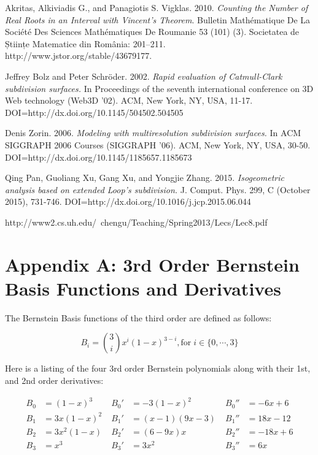 \documentclass[12pt, letterpaper]{article}
\begin{document}
\begin{thebibliography}{9}
Akritas, Alkiviadis G., and Panagiotis S. Vigklas. 2010.
\emph{Counting the Number of Real Roots in an Interval with Vincent's Theorem}.
Bulletin Mathématique De La Société Des Sciences Mathématiques De Roumanie 53 (101) (3). Societatea de Științe Matematice din România: 201–211. http://www.jstor.org/stable/43679177.

Jeffrey Bolz and Peter Schröder. 2002.
\emph{Rapid evaluation of Catmull-Clark subdivision surfaces.}
In Proceedings of the seventh international conference on 3D Web technology (Web3D '02). ACM, New York, NY, USA, 11-17. DOI=http://dx.doi.org/10.1145/504502.504505

Denis Zorin. 2006.
\emph{Modeling with multiresolution subdivision surfaces.}
In ACM SIGGRAPH 2006 Courses (SIGGRAPH '06). ACM, New York, NY, USA, 30-50. DOI=http://dx.doi.org/10.1145/1185657.1185673

Qing Pan, Guoliang Xu, Gang Xu, and Yongjie Zhang. 2015.
\emph{Isogeometric analysis based on extended Loop's subdivision.}
J. Comput. Phys. 299, C (October 2015), 731-746. DOI=http://dx.doi.org/10.1016/j.jcp.2015.06.044

http://www2.cs.uh.edu/~chengu/Teaching/Spring2013/Lecs/Lec8.pdf


\end{thebibliography}

\newpage

\section*{Appendix A: 3rd Order Bernstein Basis Functions and Derivatives}

The Bernstein Basis functions of the third order are defined as follows:

$$B_{i} = \binom {3}{i} x^{i}(1 - x)^{3 - i}, \text{for} \; i \in \{0, \cdots, 3\}$$

Here is a listing of the four 3rd order Bernstein polynomials along with their 1st, and 2nd order derivatives:

\begin{align*}
B_{0} &= (1 - x)^{3} \; & B_{0}' &= -3(1-x)^{2} \; & B_{0}'' &= - 6x + 6\\
B_{1} &= 3x(1 - x)^{2} \; & B_{1}' &= (x - 1)(9x - 3) \; & B_{1}'' &= 18 x - 12\\
B_{2} &= 3x^{2}(1 - x) \; & B_{2}' &= (6 - 9x)x \; & B_{2}'' &= -18x + 6 \\
B_{3} &= x^{3} \; & B_{3}' &= 3x^{2} \; & B_{3}'' &= 6x\\
\end{align*}
\end{document}
